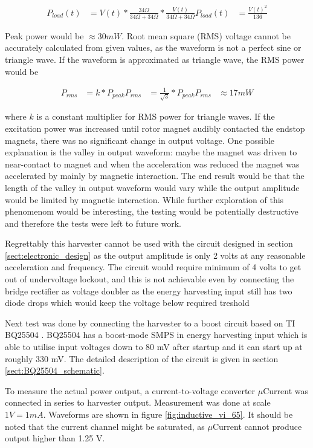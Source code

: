 \begin{align}
  P_{load}(t)& = V(t) * \frac{ 34 \Omega }{ 34 \Omega + 34 \Omega } * \frac{ V(t) }{ 34 \Omega + 34 \Omega }
  P_{load}(t)& = \frac{V(t)^2}{136}  
\end{align}

Peak power would be $ \approx 30 mW $. Root mean square (RMS) voltage cannot be accurately calculated from given values, as the waveform is not a perfect sine or triangle wave. If the waveform is approximated as triangle wave, the RMS power would be 

\begin{align}
  P_{rms}& = k * P_{peak}
  P_{rms}& = \frac{1}{\sqrt{3}} * P_{peak}
  P_{rms}& \approx 17 mW 
\end{align}

where $k$ is a constant multiplier for RMS power for triangle waves. 
If the excitation power was increased until rotor magnet audibly contacted the endstop magnets, there was no significant change in output voltage. One possible explanation is the valley in output waveform: maybe the magnet was driven to near-contact to magnet and when the acceleration was reduced the magnet was accelerated by mainly by magnetic interaction. The end result would be that the length of the valley in output waveform would vary while the output amplitude would be limited by magnetic interaction. While further exploration of this phenomenom would be interesting, the testing would be potentially destructive and therefore the tests were left to future work.

Regrettably this harvester cannot be used with the circuit designed in section \ref{sect:electronic_design} as the output amplitude is only 2 volts at any reasonable acceleration and frequency. The circuit would require minimum of 4 volts to get out of undervoltage lockout, and this is not achievable even by connecting the bridge rectifier as voltage doubler as the energy harvesting input still has two diode drops which would keep the voltage below required treshold

Next test was done by connecting the harvester to a boost circuit based on TI BQ25504 \cite{BQ25504}. BQ25504 has a boost-mode SMPS in energy harvesting input which is able to utilise input voltages down to 80 mV after startup and it can start up at roughly 330 mV. The detailed description of the circuit is given in section \ref{sect:BQ25504_schematic}.

To measure the actual power output, a current-to-voltage converter $\mu$Current \cite{muCurrent} was connected in series to harvester output. Measurement was done at scale $1 V = 1 mA$. Waveforms are shown in figure \ref{fig:inductive_vi_65}. It should be noted that the current channel might be saturated, as $\mu$Current cannot produce output higher than 1.25 V.

